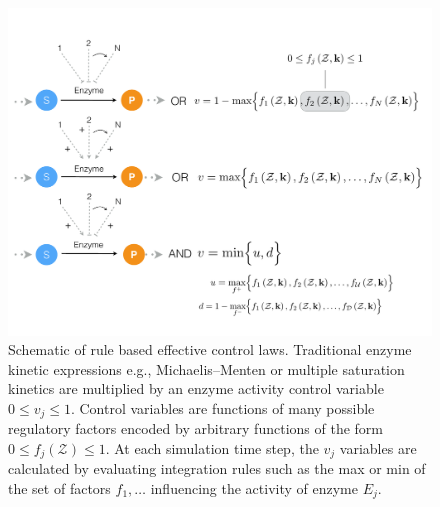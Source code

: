 \documentclass[12pt]{article}
\begin{document}
\clearpage

\begin{figure}
\centering
\includegraphics[width=1.0\textwidth]{./figs/Figure-2-ControlSchematic.pdf}
\caption{Schematic of rule based effective control laws. 
Traditional enzyme kinetic expressions e.g., Michaelis–Menten or multiple saturation kinetics are multiplied by an enzyme activity control variable $0 \leq v_{j} \leq 1 $. 
Control variables are functions of many possible regulatory factors encoded by arbitrary functions of the form $0\leq f_{j}\left(\mathcal{Z}\right)\leq 1$.
At each simulation time step, the $v_{j}$ variables are calculated by evaluating integration rules such as the max or min of the set of factors $f_{1},\hdots$ 
influencing the activity of enzyme $E_{j}$. }\label{fig-control-schematic}
\end{figure}

\clearpage
\end{document}
